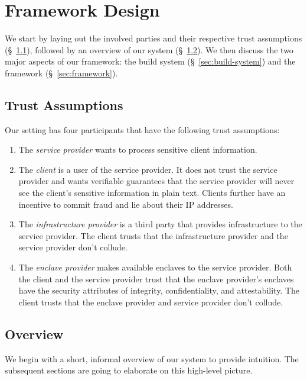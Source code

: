 \section{Framework Design}
\label{sec:design}

We start by laying out the involved parties and their respective trust assumptions (\S~\ref{sec:trust-assumptions}), followed by an overview of our system (\S~\ref{sec:overview}).  We then discuss the two major aspects of our framework: the build system (\S~\ref{sec:build-system}) and the framework (\S~\ref{sec:framework}).

\subsection{Trust Assumptions}
\label{sec:trust-assumptions}

Our setting has four participants that have the following trust assumptions:

\begin{enumerate}
    \item The \emph{service provider} wants to process sensitive client information.
    \item The \emph{client} is a user of the service provider.  It does not trust the service provider and wants verifiable guarantees that the service provider will never see the client's sensitive information in plain text.  Clients further have an incentive to commit fraud and lie about their IP addresses.
    \item The \emph{infrastructure provider} is a third party that provides infrastructure to the service provider.  The client trusts that the infrastructure provider and the service provider don't collude.
    \item The \emph{enclave provider} makes available enclaves to the service provider.  Both the client and the service provider trust that the enclave provider's enclaves have the security attributes of integrity, confidentiality, and attestability.  The client trusts that the enclave provider and service provider don't collude.
\end{enumerate}

\subsection{Overview}
\label{sec:overview}

We begin with a short, informal overview of our system to provide intuition.  The subsequent sections are going to elaborate on this high-level picture.  

